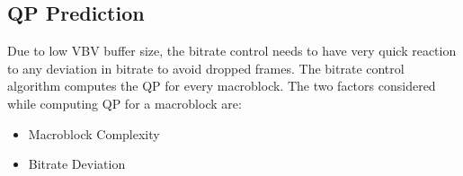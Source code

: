 \documentclass[11pt]{article} %
\begin{document}
\subsection{QP Prediction}  \label{used QP prediction overview}
  Due to low VBV buffer size, the bitrate control needs to have very quick reaction to any deviation in bitrate to avoid dropped frames. The bitrate control algorithm computes the QP for every macroblock. The two factors considered while computing QP for a macroblock are:
  
\begin{itemize}  
\item Macroblock Complexity
\item Bitrate Deviation
\end{itemize}
\end{document}
